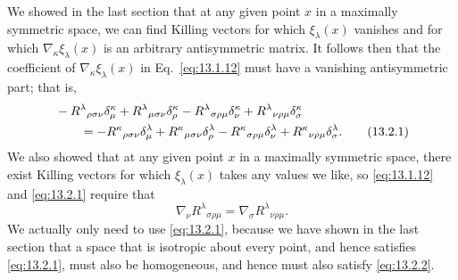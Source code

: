 We showed in the last section that at any given point \(x\) in a maximally
symmetric space, we can find Killing vectors for which \(\xi_\lambda(x)\)
vanishes and for which \(\nabla_\kappa\xi_\lambda(x)\) is an arbitrary
antisymmetric matrix. It follows then that the coefficient of
\(\nabla_\kappa\xi_\lambda(x)\) in Eq.~\eqref{eq:13.1.12} must have a
vanishing antisymmetric part; that is,
\begin{align}
  &-R^\lambda{}_{\rho\sigma\nu}\delta_\mu^\kappa
  +R^\lambda{}_{\mu\sigma\nu}\delta_\rho^\kappa
  -R^\lambda{}_{\sigma\rho\mu}\delta_\nu^\kappa
  +R^\lambda{}_{\nu\rho\mu}\delta_\sigma^\kappa
  \notag\\
  &\qquad =
  -R^\kappa{}_{\rho\sigma\nu}\delta_\mu^\lambda
  +R^\kappa{}_{\mu\sigma\nu}\delta_\rho^\lambda
  -R^\kappa{}_{\sigma\rho\mu}\delta_\nu^\lambda
  +R^\kappa{}_{\nu\rho\mu}\delta_\sigma^\lambda.
  \tag{13.2.1}\label{eq:13.2.1}
\end{align}
We also showed that at any given point \(x\) in a maximally symmetric space,
there exist Killing vectors for which \(\xi_\lambda(x)\) takes any values
we like, so \eqref{eq:13.1.12} and \eqref{eq:13.2.1} require that
\begin{equation}
  \nabla_\nu R^\lambda{}_{\sigma\rho\mu}
  =
  \nabla_\sigma R^\lambda{}_{\nu\rho\mu}.
  \tag{13.2.2}\label{eq:13.2.2}
\end{equation}
We actually only need to use \eqref{eq:13.2.1}, because we have shown in the
last section that a space that is isotropic about every point, and hence
satisfies \eqref{eq:13.2.1}, must also be homogeneous, and hence must also
satisfy \eqref{eq:13.2.2}.

